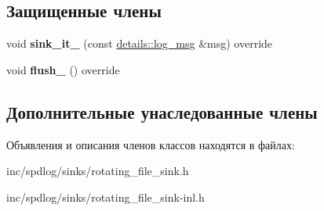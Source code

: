 \subsection*{Защищенные члены}
\begin{DoxyCompactItemize}
\item 
\mbox{\label{classspdlog_1_1sinks_1_1rotating__file__sink_ac16afbf9b9a9bcfb1fae090151215e21}} 
void {\bfseries sink\+\_\+it\+\_\+} (const \hyperlink{structspdlog_1_1details_1_1log__msg}{details\+::log\+\_\+msg} \&msg) override
\item 
\mbox{\label{classspdlog_1_1sinks_1_1rotating__file__sink_a4460acd8ced94d958d6882871f6e9954}} 
void {\bfseries flush\+\_\+} () override
\end{DoxyCompactItemize}
\subsection*{Дополнительные унаследованные члены}


Объявления и описания членов классов находятся в файлах\+:\begin{DoxyCompactItemize}
\item 
inc/spdlog/sinks/rotating\+\_\+file\+\_\+sink.\+h\item 
inc/spdlog/sinks/rotating\+\_\+file\+\_\+sink-\/inl.\+h\end{DoxyCompactItemize}
